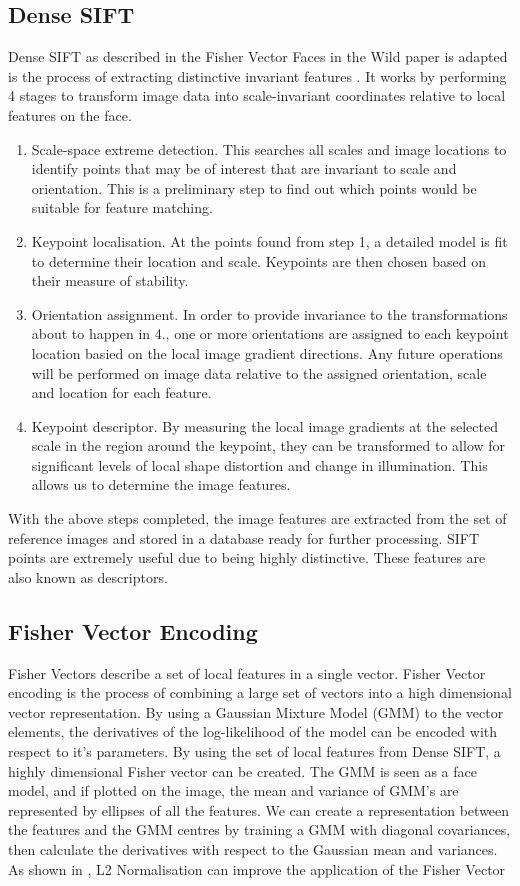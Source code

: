 \documentclass[12pt, a4paper]{article}
\begin{document}
\subsection{Dense SIFT}
Dense SIFT as described in the Fisher Vector Faces in the Wild paper is adapted is the process of extracting distinctive invariant features \cite{denseSift}. It works by performing 4 stages to transform image data into scale-invariant coordinates relative to local features on the face.
\begin{enumerate}
\item Scale-space extreme detection. This searches all scales and image locations to identify points that may be of interest that are invariant to scale and orientation. This is a preliminary step to find out which points would be suitable for feature matching.
\item Keypoint localisation. At the points found from step 1, a detailed model is fit to determine their location and scale. Keypoints are then chosen based on their measure of stability.
\item Orientation assignment. In order to provide invariance to the transformations about to happen in 4., one or more orientations are assigned to each keypoint location basied on the local image gradient directions. Any future operations will be performed on image data relative to the assigned orientation, scale and location for each feature.
\item Keypoint descriptor. By measuring the local image gradients at the selected scale in the region around the keypoint, they can be transformed to allow for significant levels of local shape distortion and change in illumination. This allows us to determine the image features.
\end{enumerate}
With the above steps completed, the image features are extracted from the set of reference images and stored in a database ready for further processing. SIFT points are extremely useful due to being highly distinctive. These features are also known as descriptors.

\subsection{Fisher Vector Encoding}
Fisher Vectors describe a set of local features in a single vector. Fisher Vector encoding is the process of combining a large set of vectors into a high dimensional vector representation. By using a Gaussian Mixture Model (GMM) to the vector elements, the derivatives of the log-likelihood of the model can be encoded with respect to it’s parameters. By using the set of local features from Dense SIFT, a highly dimensional Fisher vector can be created. The GMM is seen as a face model, and if plotted on the image, the mean and variance of GMM’s are represented by ellipses of all the features. We can create a representation between the features and the GMM centres by training a GMM with diagonal covariances, then calculate the derivatives with respect to the Gaussian mean and variances. As shown in \cite{improvingFisher}, L2 Normalisation can improve the application of the Fisher Vector 
\end{document}
